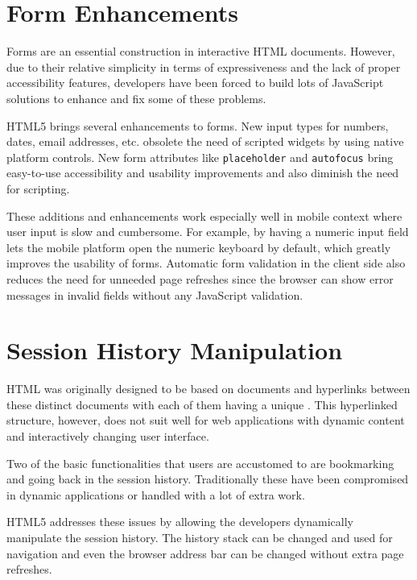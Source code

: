 \section{Form Enhancements}

Forms are an essential construction in interactive HTML
documents. However, due to their relative simplicity in terms of
expressiveness and the lack of proper accessibility features,
developers have been forced to build lots of JavaScript solutions to
enhance and fix some of these problems.

HTML5 brings several enhancements to forms. New input types for
numbers, dates, email addresses, etc. obsolete the need of scripted
widgets by using native platform controls. New form attributes like
\texttt{placeholder} and \texttt{autofocus} bring easy-to-use
accessibility and usability improvements and also diminish the need
for scripting. \cite{HTML5draft}

These additions and enhancements work especially well in mobile
context where user input is slow and cumbersome. For example, by
having a numeric input field lets the mobile platform open the numeric
keyboard by default, which greatly improves the usability of
forms. Automatic form validation in the client side also reduces the
need for unneeded page refreshes since the browser can show error
messages in invalid fields without any JavaScript validation.

\section{Session History Manipulation}

HTML was originally designed to be based on documents and hyperlinks
between these distinct documents with each of them having a unique
. This hyperlinked structure, however, does not suit well
for web applications with dynamic content and interactively changing
user interface.

Two of the basic functionalities that users are accustomed to are
bookmarking and going back in the session history. Traditionally these
have been compromised in dynamic  applications or handled
with a lot of extra work.

HTML5 addresses these issues by allowing the developers dynamically
manipulate the session history. The history stack can be changed and
used for navigation and even the browser address bar can be changed
without extra page refreshes. \cite{HTML5draft}

